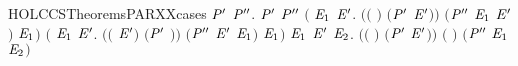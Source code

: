 \begin{SaveVerbatim}{HOLCCSTheoremsPARXXcases}
\HOLTokenTurnstile{} \HOLSymConst{\HOLTokenForall{}} \ensuremath{\HOLBoundVar{P}\sp{\prime}}  \ensuremath{\HOLBoundVar{P}\sp{\prime\prime}}.
        \HOLSymConst{\ensuremath{\mid}} \ensuremath{\HOLBoundVar{P}\sp{\prime}} \HOLTokenTransBegin{}\HOLTokenTransEnd \ensuremath{\HOLBoundVar{P}\sp{\prime\prime}} \HOLSymConst{\HOLTokenImp{}}
       \ensuremath{(}\HOLSymConst{\HOLTokenExists{}} \ensuremath{\HOLBoundVar{E}\sb{\mathrm{1}}} \ensuremath{\HOLBoundVar{E}\sp{\prime}}.
            \ensuremath{(}\ensuremath{(} \HOLSymConst{\ensuremath{=}} \ensuremath{)} \HOLSymConst{\HOLTokenConj{}} \ensuremath{(}\ensuremath{\HOLBoundVar{P}\sp{\prime}} \HOLSymConst{\ensuremath{=}} \ensuremath{\HOLBoundVar{E}\sp{\prime}}\ensuremath{)}\ensuremath{)} \HOLSymConst{\HOLTokenConj{}} \ensuremath{(}\ensuremath{\HOLBoundVar{P}\sp{\prime\prime}} \HOLSymConst{\ensuremath{=}} \ensuremath{\HOLBoundVar{E}\sb{\mathrm{1}}} \HOLSymConst{\ensuremath{\mid}} \ensuremath{\HOLBoundVar{E}\sp{\prime}}\ensuremath{)} \HOLSymConst{\HOLTokenConj{}}  \HOLTokenTransBegin{}\HOLTokenTransEnd \ensuremath{\HOLBoundVar{E}\sb{\mathrm{1}}}\ensuremath{)} \HOLSymConst{\HOLTokenDisj{}}
       \ensuremath{(}\HOLSymConst{\HOLTokenExists{}} \ensuremath{\HOLBoundVar{E}\sb{\mathrm{1}}} \ensuremath{\HOLBoundVar{E}\sp{\prime}}.
            \ensuremath{(}\ensuremath{(} \HOLSymConst{\ensuremath{=}} \ensuremath{\HOLBoundVar{E}\sp{\prime}}\ensuremath{)} \HOLSymConst{\HOLTokenConj{}} \ensuremath{(}\ensuremath{\HOLBoundVar{P}\sp{\prime}} \HOLSymConst{\ensuremath{=}} \ensuremath{)}\ensuremath{)} \HOLSymConst{\HOLTokenConj{}} \ensuremath{(}\ensuremath{\HOLBoundVar{P}\sp{\prime\prime}} \HOLSymConst{\ensuremath{=}} \ensuremath{\HOLBoundVar{E}\sp{\prime}} \HOLSymConst{\ensuremath{\mid}} \ensuremath{\HOLBoundVar{E}\sb{\mathrm{1}}}\ensuremath{)} \HOLSymConst{\HOLTokenConj{}}  \HOLTokenTransBegin{}\HOLTokenTransEnd \ensuremath{\HOLBoundVar{E}\sb{\mathrm{1}}}\ensuremath{)} \HOLSymConst{\HOLTokenDisj{}}
       \HOLSymConst{\HOLTokenExists{}}  \ensuremath{\HOLBoundVar{E}\sb{\mathrm{1}}} \ensuremath{\HOLBoundVar{E}\sp{\prime}} \ensuremath{\HOLBoundVar{E}\sb{\mathrm{2}}}.
           \ensuremath{(}\ensuremath{(} \HOLSymConst{\ensuremath{=}} \ensuremath{)} \HOLSymConst{\HOLTokenConj{}} \ensuremath{(}\ensuremath{\HOLBoundVar{P}\sp{\prime}} \HOLSymConst{\ensuremath{=}} \ensuremath{\HOLBoundVar{E}\sp{\prime}}\ensuremath{)}\ensuremath{)} \HOLSymConst{\HOLTokenConj{}} \ensuremath{(} \HOLSymConst{\ensuremath{=}} \HOLConst{\ensuremath{\tau}}\ensuremath{)} \HOLSymConst{\HOLTokenConj{}} \ensuremath{(}\ensuremath{\HOLBoundVar{P}\sp{\prime\prime}} \HOLSymConst{\ensuremath{=}} \ensuremath{\HOLBoundVar{E}\sb{\mathrm{1}}} \HOLSymConst{\ensuremath{\mid}} \ensuremath{\HOLBoundVar{E}\sb{\mathrm{2}}}\ensuremath{)} \HOLSymConst{\HOLTokenConj{}}

\end{SaveVerbatim}

